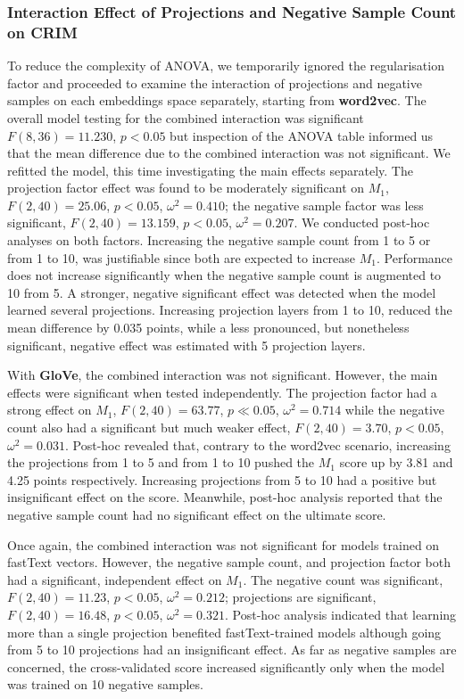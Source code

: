 \subsubsection{Interaction Effect of Projections and Negative Sample Count on CRIM}
To reduce the complexity of \ac{ANOVA}, we temporarily ignored the regularisation factor and proceeded to examine the interaction of projections and negative samples on each embeddings space separately, starting from \textbf{word2vec}.  The overall model testing for the combined interaction was significant $F(8, 36)= 11.230$, $p<0.05$ but inspection of the \ac{ANOVA} table informed us that the mean difference due to the combined interaction was not significant.  We refitted the model, this time investigating the main effects separately.  The projection factor effect was found to be moderately significant on $M_1$, $F(2,40)=25.06$, $p < 0.05$, $\omega^2=0.410$; the negative sample factor was less significant, $F(2,40)=13.159$, $p < 0.05$, $\omega^2 = 0.207$.  We conducted post-hoc analyses on both factors. Increasing the negative sample count from 1 to 5 or from 1 to 10, was justifiable since both are expected to increase $M_1$. Performance does not increase significantly when the negative sample count is augmented to 10 from 5.  A stronger, negative significant effect was detected when the model learned several projections.  Increasing projection layers from 1 to 10, reduced the mean difference by 0.035 points, while a less pronounced, but nonetheless significant, negative effect was estimated with 5 projection layers.

With \textbf{GloVe}, the combined interaction was not significant. However, the main effects were significant when tested independently.  The projection factor had a strong effect on $M_1$, $F(2,40) = 63.77$, $p \ll 0.05$, $\omega^2=0.714$ while the negative count also had a significant but much weaker effect, $F(2,40) = 3.70$, $p < 0.05$, $\omega^2 = 0.031$.  Post-hoc revealed that, contrary to the word2vec scenario, increasing the projections from 1 to 5 and from 1 to 10 pushed the $M_1$ score up by 3.81 and 4.25 points respectively.  Increasing projections from 5 to 10 had a positive but insignificant effect on the score.  Meanwhile, post-hoc analysis reported that the negative sample count had no significant effect on the ultimate score.

Once again, the combined interaction was not significant for models trained on fastText vectors.  However, the negative sample count, and projection factor both had a significant, independent effect on $M_1$.  The negative count was significant, $F(2,40)=11.23$, $p < 0.05$, $\omega^2 = 0.212$; projections are significant, $F(2,40)=16.48$, $p < 0.05$, $\omega^2 = 0.321$.  Post-hoc analysis indicated that learning more than a single projection benefited fastText-trained models although going from 5 to 10 projections had an insignificant effect.  As far as negative samples are concerned, the cross-validated score increased significantly only when the model was trained on 10 negative samples.

